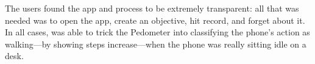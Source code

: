 The users found the app and process to be extremely transparent: all
that was needed was to open the app, create an objective, hit record, and
forget about it. In all cases, \PocketMocker{} was able to trick the
Pedometer into classifying the phone's action as walking---by showing steps
increase---when the phone was really sitting idle on a desk.
